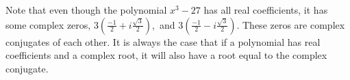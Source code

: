 Note that even though the polynomial $x^{3}-27$ has all real coefficients,
it has some complex zeros, $3\left( \displaystyle
\frac{-1}{2}+i\displaystyle\frac{\sqrt{3}}{2}\right) ,$ and $3\left( 
\displaystyle\frac{-1}{2}-i\displaystyle\frac{\sqrt{3}}{2}\right) $. 
These zeros are complex conjugates of each other. It is always the case that if a polynomial has real 
coefficients and a complex root, it will also
have a root equal to the complex conjugate.